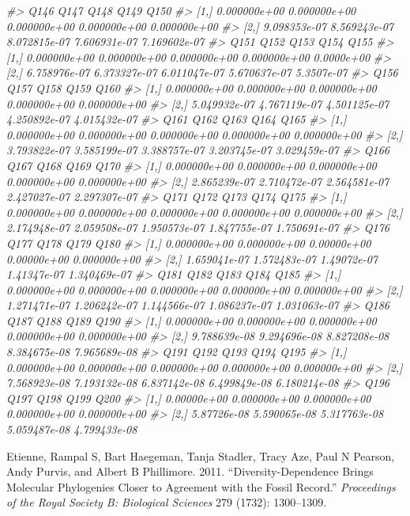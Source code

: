 \documentclass[]{article}
\newenvironment{Shaded}{\begin{snugshade}}{\end{snugshade}}
\newcommand{\CommentTok}[1]{\textcolor[rgb]{0.56,0.35,0.01}{\textit{#1}}}
\begin{document}
\begin{Shaded}
\begin{Highlighting}[]
\CommentTok{#>              Q146         Q147         Q148         Q149         Q150}
\CommentTok{#> [1,] 0.000000e+00 0.000000e+00 0.000000e+00 0.000000e+00 0.000000e+00}
\CommentTok{#> [2,] 9.098353e-07 8.569243e-07 8.072815e-07 7.606931e-07 7.169602e-07}
\CommentTok{#>              Q151         Q152         Q153         Q154       Q155}
\CommentTok{#> [1,] 0.000000e+00 0.000000e+00 0.000000e+00 0.000000e+00 0.0000e+00}
\CommentTok{#> [2,] 6.758976e-07 6.373327e-07 6.011047e-07 5.670637e-07 5.3507e-07}
\CommentTok{#>              Q156         Q157         Q158         Q159         Q160}
\CommentTok{#> [1,] 0.000000e+00 0.000000e+00 0.000000e+00 0.000000e+00 0.000000e+00}
\CommentTok{#> [2,] 5.049932e-07 4.767119e-07 4.501125e-07 4.250892e-07 4.015432e-07}
\CommentTok{#>              Q161         Q162         Q163         Q164         Q165}
\CommentTok{#> [1,] 0.000000e+00 0.000000e+00 0.000000e+00 0.000000e+00 0.000000e+00}
\CommentTok{#> [2,] 3.793822e-07 3.585199e-07 3.388757e-07 3.203745e-07 3.029459e-07}
\CommentTok{#>              Q166         Q167         Q168         Q169         Q170}
\CommentTok{#> [1,] 0.000000e+00 0.000000e+00 0.000000e+00 0.000000e+00 0.000000e+00}
\CommentTok{#> [2,] 2.865239e-07 2.710472e-07 2.564581e-07 2.427027e-07 2.297307e-07}
\CommentTok{#>              Q171         Q172         Q173         Q174         Q175}
\CommentTok{#> [1,] 0.000000e+00 0.000000e+00 0.000000e+00 0.000000e+00 0.000000e+00}
\CommentTok{#> [2,] 2.174948e-07 2.059508e-07 1.950573e-07 1.847755e-07 1.750691e-07}
\CommentTok{#>              Q176         Q177        Q178        Q179         Q180}
\CommentTok{#> [1,] 0.000000e+00 0.000000e+00 0.00000e+00 0.00000e+00 0.000000e+00}
\CommentTok{#> [2,] 1.659041e-07 1.572483e-07 1.49072e-07 1.41347e-07 1.340469e-07}
\CommentTok{#>              Q181         Q182         Q183         Q184         Q185}
\CommentTok{#> [1,] 0.000000e+00 0.000000e+00 0.000000e+00 0.000000e+00 0.000000e+00}
\CommentTok{#> [2,] 1.271471e-07 1.206242e-07 1.144566e-07 1.086237e-07 1.031063e-07}
\CommentTok{#>              Q186         Q187         Q188         Q189         Q190}
\CommentTok{#> [1,] 0.000000e+00 0.000000e+00 0.000000e+00 0.000000e+00 0.000000e+00}
\CommentTok{#> [2,] 9.788639e-08 9.294696e-08 8.827208e-08 8.384675e-08 7.965689e-08}
\CommentTok{#>              Q191         Q192         Q193         Q194         Q195}
\CommentTok{#> [1,] 0.000000e+00 0.000000e+00 0.000000e+00 0.000000e+00 0.000000e+00}
\CommentTok{#> [2,] 7.568923e-08 7.193132e-08 6.837142e-08 6.499849e-08 6.180214e-08}
\CommentTok{#>             Q196         Q197         Q198         Q199         Q200}
\CommentTok{#> [1,] 0.00000e+00 0.000000e+00 0.000000e+00 0.000000e+00 0.000000e+00}
\CommentTok{#> [2,] 5.87726e-08 5.590065e-08 5.317763e-08 5.059487e-08 4.799433e-08}
\end{Highlighting}
\end{Shaded}

\hypertarget{refs}{}
\leavevmode\hypertarget{ref-etienne2012diversity}{}%
Etienne, Rampal S, Bart Haegeman, Tanja Stadler, Tracy Aze, Paul N Pearson, Andy Purvis, and Albert B Phillimore. 2011. ``Diversity-Dependence Brings Molecular Phylogenies Closer to Agreement with the Fossil Record.'' \emph{Proceedings of the Royal Society B: Biological Sciences} 279 (1732): 1300--1309.
\end{document}

